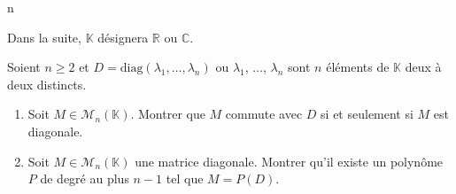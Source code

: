 n\documentclass[a4paper,10pt]{report}
\begin{document}
\everymath{\displaystyle}

\begin{center}
\end{center}


\bigskip

\noindent Dans la suite, $\mathbb{K}$ désignera $\mathbb{R}$ ou $\mathbb{C}$.

\medskip

\begin{Exa} Soient $n \geq 2$ et $D= \textrm{diag}(\lambda_1, \ldots, \lambda_n)$ ou $\lambda_1$, $\ldots$, $\lambda_n$ sont $n$ éléments de $\mathbb{K}$ deux à deux distincts.
\begin{enumerate}
\item Soit $M \in \mathcal{M}_n(\mathbb{K})$. Montrer que $M$ commute avec $D$ si et seulement si $M$ est diagonale.
\item Soit $M \in \mathcal{M}_n(\mathbb{K})$ une matrice diagonale. Montrer qu'il existe un polynôme $P$ de degré au plus $n-1$ tel que $M=P(D)$.
\end{enumerate}
\end{Exa}
\end{document}
